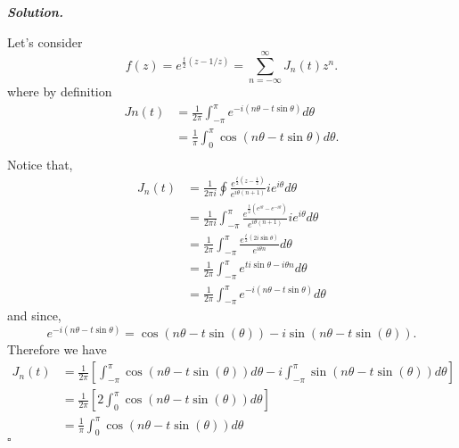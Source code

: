 \documentclass[12pt]{report}
\newenvironment{solution}[1][\it{Solution}]{\textbf{#1. } }{$\square$}
\begin{document}
\begin{solution}

    \noindent
    Let's consider $$f(z) = e^{\frac{t}{2}(z-1/z)} = \sum_{n=-\infty}^{\infty} J_n(t)z^n.$$ where by definition 
    \begin{align*}
        Jn(t) &= \frac{1}{2\pi} \int_{-\pi}^{\pi} e^{-i(n\theta-t\sin\theta)}d\theta\\
              &= \frac{1}{\pi} \int_0^\pi \cos(n\theta - t\sin \theta)d\theta.\\
    \end{align*} 
    Notice that,
    \begin{align*}
        J_n(t) &= \frac{1}{2\pi i} \oint \frac{e^{\frac{t}{2}(z - \frac{1}{z})}}{e^{i\theta(n + 1)}}ie^{i\theta}d\theta\\
        &= \frac{1}{2\pi i} \int_{-\pi}^{\pi} \frac{e^{\frac{t}{2}(e^{i\theta} - e^{-i\theta})}}{e^{i\theta(n + 1)}}ie^{i\theta}d\theta\\
        &= \frac{1}{2\pi} \int_{-\pi}^{\pi} \frac{e^{\frac{t}{2}(2i\sin\theta)}}{e^{i\theta n}}d\theta\\
        &= \frac{1}{2\pi}\int_{-\pi}^{\pi}e^{ti\sin\theta - i\theta n}d\theta\\
        &= \frac{1}{2\pi} \int_{-\pi}^{\pi} e^{-i(n\theta - t\sin\theta)}d\theta
    \end{align*}
    and since,
    $$e^{-i(n\theta - t\sin\theta)} = \cos(n \theta - t \sin(\theta)) - i \sin(n \theta - t \sin(\theta)).$$
    Therefore we have
    \begin{align*}
        J_n(t) &= \frac{1}{2\pi} \left[ \int_{-\pi}^{\pi} \cos(n \theta - t \sin(\theta)) d\theta - i \int_{-\pi}^{\pi} \sin(n \theta - t \sin(\theta)) d\theta\right]\\
        &= \frac{1}{2\pi}\left[ 2 \int_0^\pi \cos(n \theta - t \sin(\theta)) d\theta\right]\\
        &= \frac{1}{\pi} \int_0^\pi \cos(n \theta - t \sin(\theta)) d\theta
    \end{align*}
\end{solution}



\end{document}
